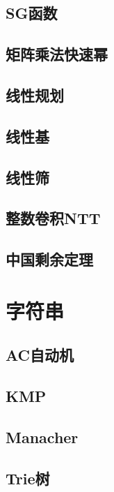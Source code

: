 \documentclass[UTF8]{ctexart}
\begin{document}
\subsection{SG函数}

\subsection{矩阵乘法快速幂}

\subsection{线性规划}

\subsection{线性基}

\subsection{线性筛}

\subsection{整数卷积NTT}

\subsection{中国剩余定理}

\section{字符串}
\subsection{AC自动机}

\subsection{KMP}

\subsection{Manacher}

\subsection{Trie树}

\end{document}
